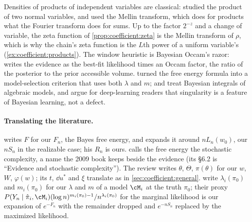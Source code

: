 \begin{refsection}
Densities of products of independent variables are classical: \textcite{Craig1936} studied the product of two normal variables, and \textcite{Epstein1948} used the Mellin transform, which does for products what the Fourier transform does for sums. Up to the factor $2^{-z}$ and a change of variable, the zeta function of \cref{prop:coefficient:zeta} is the Mellin transform of $\rho$, which is why the chain's zeta function is the $L$th power of a uniform variable's (\cref{ex:coefficient:products}). The window heuristic is Bayesian Occam's razor: \textcite[ch.~28]{MacKay2003} writes the evidence as the best-fit likelihood times an Occam factor, the ratio of the posterior to the prior accessible volume. \Textcite{DrtonPlummer2017} turned the free energy formula into a model-selection criterion that uses both $\lambda$ and $m$; \textcite{DrtonEtAl2009} and \textcite{Lin2011} treat Bayesian integrals of algebraic models, and \textcite{WeiEtAl2023} argue for deep-learning readers that singularity is a feature of Bayesian learning, not a defect.

\paragraph{Translating the literature.} \Textcite{Watanabe2013} writes $F$ for our $F_n$, the Bayes free energy, and expands it around $nL_n(w_0)$, our $nS_n$ in the realizable case; his $R_n$ is ours. \Textcite{Watanabe2001a} calls the free energy the stochastic complexity, a name the 2009 book keeps beside the evidence (its \S6.2 is ``Evidence and stochastic complexity''). The review \parencite{Watanabe2024} writes $\theta$, $\Theta$, $\pi(\theta)$ for our $w$, $W$, $\varphi(w)$; its $t$, $\dd u^*$ and $\xi$ translate as in \cref{sec:coefficient:general}. \Textcite{DrtonPlummer2017} write $\lambda_i(\pi_0)$ and $m_i(\pi_0)$ for our $\lambda$ and $m$ of a model $\cM_i$ at the truth $\pi_0$; their proxy $P(Y_n\mid\hat\pi_i,\cM_i)(\log n)^{m_i(\pi_0)-1}/n^{\lambda_i(\pi_0)}$ for the marginal likelihood is our expansion of $e^{-F_n}$ with the remainder dropped and $e^{-nS_n}$ replaced by the maximized likelihood.

\printchapterbib
\end{refsection}
